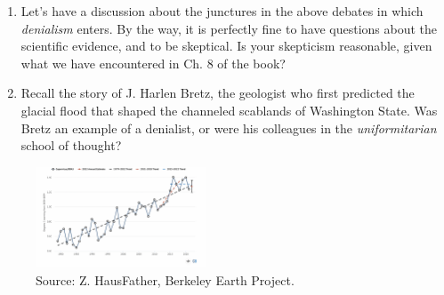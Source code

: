 \documentclass{article}
\begin{document}
\begin{enumerate}
\item Let's have a discussion about the junctures in the above debates in which \textit{denialism} enters.  By the way, it is perfectly fine to have questions about the scientific evidence, and to be skeptical.  Is your skepticism reasonable, given what we have encountered in Ch. 8 of the book? \\ \vspace{2cm}
\item Recall the story of J. Harlen Bretz, the geologist who first predicted the glacial flood that shaped the channeled scablands of Washington State.  Was Bretz an example of a denialist, or were his colleagues in the \textit{uniformitarian} school of thought?
\end{enumerate}
\small
\begin{figure}
\centering
\includegraphics[width=0.45\textwidth]{figures/pause.png}
\caption{\label{fig:1} Source: Z. HausFather, Berkeley Earth Project.}
\end{figure}
\end{document}
